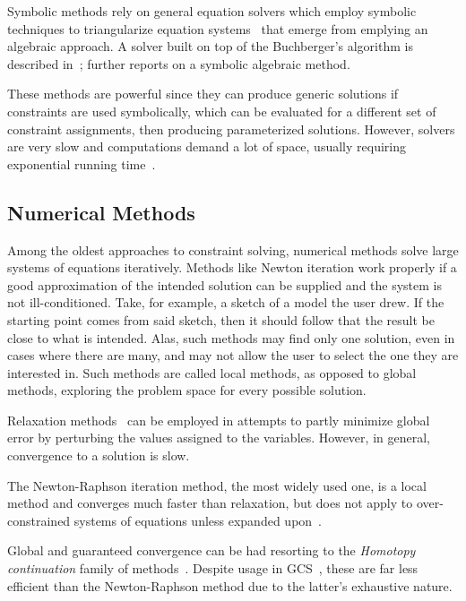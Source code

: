 Symbolic methods rely on general equation solvers which employ symbolic
techniques to triangularize equation
systems~\cite{Chou:1988:IWMMTPG,Buchberger:1995:Grobner} that emerge from
emplying an algebraic approach.  A solver built on top of the Buchberger's
algorithm is described in~\cite{Buchanan:1993:CDS}; 
further reports on a symbolic algebraic method.

These methods are powerful since they can produce generic solutions if
constraints are used symbolically, which can be evaluated for a different set of
constraint assignments, then producing parameterized solutions.  However,
solvers are very slow and computations demand a lot of space, usually requiring
exponential running time~\cite{Durand:1998:SNTCS}.

\subsection{Numerical Methods}%
\label{sec:intro.constraints.numerical}

Among the oldest approaches to constraint solving, numerical methods solve large
systems of equations iteratively.  Methods like Newton iteration work properly
if a good approximation of the intended solution can be supplied and the system
is not ill-conditioned.  Take, for example, a sketch of a model the user drew.
If the starting point comes from said sketch, then it should follow that the
result be close to what is intended.  Alas, such methods may find only one
solution, even in cases where there are many, and may not allow the user to
select the one they are interested in.  Such methods are called local methods,
as opposed to global methods, exploring the problem space for every possible
solution.

Relaxation
methods~\cite{Sutherland:1964:Sketchpad,Hillyard:1978:CNSTDT,Borning:1989:PLATL}
can be employed in attempts to partly minimize global error by perturbing the
values assigned to the variables.  However, in general, convergence to a
solution is slow.

The Newton-Raphson iteration method, the most widely used one, is a local method
and converges much faster than relaxation, but does not apply to
over-constrained systems of equations unless expanded
upon~\cite{Dedieu:2000:Newton}.

Global and guaranteed convergence can be had resorting to the \textit{Homotopy
continuation} family of methods~\cite{Allgower:1993:CPF}.  Despite usage in
\ac{GCS}~\cite{Lamure:1996:SGCH,Durand:1998:SNTCS}, these are far less efficient
than the Newton-Raphson method due to the latter's exhaustive nature.

